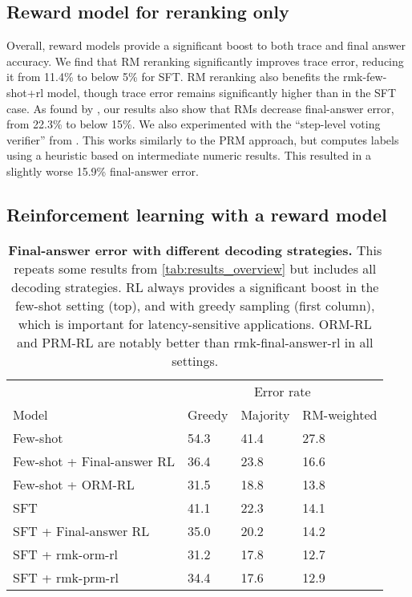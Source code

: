 \documentclass[11pt, a4paper, logo]{deepmind}
\newcommand{\PRM}{PRM}
\newcommand{\Short}[1]{\csname rmk-#1\endcsname}
\newcommand{\fewshotANDrl}{\Short{few-shot+rl}}
\newcommand{\finalanswerrl}{\Short{final-answer-rl}}
\newcommand{\ormrl}{ORM-RL}
\newcommand{\prmrl}{PRM-RL}
\begin{document}
\subsection{Reward model for reranking only}
\label{subsec:results_rm}


Overall, reward models provide a significant boost to both trace and final answer accuracy.
We find that RM reranking significantly improves trace error, reducing it from 11.4\% to below 5\% for SFT.
RM reranking also benefits the \fewshotANDrl{} model, though trace error remains significantly higher than in the SFT case.
As found by \citet{cobbe2021training}, our results also show that RMs decrease final-answer error, from 22.3\% to below 15\%.
We also experimented with the ``step-level voting verifier'' from \citet{li2022advance}. This works similarly to the \PRM{} approach, but computes labels using a heuristic based on intermediate numeric results.
This resulted in a slightly worse 15.9\% final-answer error.









\subsection{Reinforcement learning with a reward model}
\label{subsec:results_rl}


\begin{table}[t]
\centering
    \begin{tabular}[t]{p{}p{}p{}p{}}
    
    \toprule
    & \multicolumn{3}{c}{Error rate} \\
    Model & Greedy & Majority & RM-weighted \\
    \midrule
Few-shot & 54.3 & 41.4& 27.8 \\
Few-shot + Final-answer RL & 36.4 & 23.8 & 16.6\\
Few-shot + ORM-RL & 31.5 & 18.8 & 13.8\\
\midrule
SFT        &  41.1 & 22.3  & 14.1  \\
SFT + Final-answer RL &  35.0 & 20.2  & 14.2  \\
SFT + \Short{orm-rl} &  31.2 & 17.8  & 12.7  \\
SFT + \Short{prm-rl} &  34.4 & 17.6  & 12.9  \\
    \bottomrule
\end{tabular}
\caption{
\textbf{Final-answer error with different decoding strategies.} This repeats some results from \cref{tab:results_overview} but includes all decoding strategies.
RL always provides a significant boost in the few-shot setting (top), and with greedy sampling (first column), which is important for latency-sensitive applications.
\ormrl{} and \prmrl{} are notably better than \finalanswerrl{} in all settings.
\label{tab:rl_decoding_results}
}
\end{table}
\end{document}
